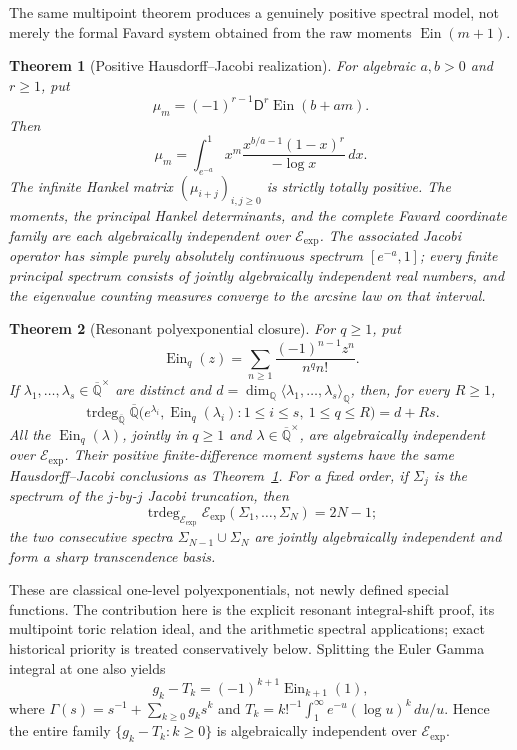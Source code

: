 \documentclass[11pt]{article}
\newtheorem{theorem}{Theorem}[section]
\theoremstyle{definition}
\theoremstyle{remark}
\newcommand{\Q}{\mathbb Q}
\newcommand{\Qbar}{\overline{\mathbb Q}}
\newcommand{\trdeg}{\operatorname{trdeg}}
\newcommand{\Ein}{\operatorname{Ein}}
\newcommand{\EinDepth}[1]{\operatorname{Ein}_{#1}}
\newcommand{\Eexp}{\mathcal E_{\mathrm{exp}}}
\begin{document}
The same multipoint theorem produces a genuinely positive spectral model,
not merely the formal Favard system obtained from the raw moments
\(\Ein(m+1)\).

\begin{theorem}[Positive Hausdorff--Jacobi realization]
\label{thm:positive-jacobi-intro}
For algebraic \(a,b>0\) and \(r\geq1\), put
\[
 \mu_m=(-1)^{r-1}\mathsf D^r\Ein(b+am).
\]
Then
\[
 \mu_m=\int_{e^{-a}}^1x^m
 \frac{x^{b/a-1}(1-x)^r}{-\log x}\,dx.
\]
The infinite Hankel matrix \((\mu_{i+j})_{i,j\geq0}\) is strictly totally
positive.  The moments, the principal Hankel determinants, and the complete
Favard coordinate family are each algebraically independent over
\(\Eexp\).  The associated Jacobi operator has simple purely absolutely
continuous spectrum \([e^{-a},1]\); every finite principal spectrum consists
of jointly algebraically independent real numbers, and the eigenvalue
counting measures converge to the arcsine law on that interval.
\end{theorem}

\begin{theorem}[Resonant polyexponential closure]
\label{thm:polyexponential-intro}
For \(q\geq1\), put
\[
 \EinDepth{q}(z)=
 \sum_{n\geq1}\frac{(-1)^{n-1}z^n}{n^q n!}.
\]
If \(\lambda_1,\ldots,\lambda_s\in\Qbar^\times\) are distinct and
\(d=\dim_\Q\langle\lambda_1,\ldots,\lambda_s\rangle_\Q\), then, for every
\(R\geq1\),
\[
 \trdeg_{\Qbar}\Qbar\bigl(
 e^{\lambda_i},\EinDepth{q}(\lambda_i):
 1\leq i\leq s,\ 1\leq q\leq R\bigr)=d+Rs.
\]
All the \(\EinDepth{q}(\lambda)\), jointly in \(q\geq1\) and
\(\lambda\in\Qbar^\times\), are algebraically independent over \(\Eexp\).
Their positive finite-difference moment systems have the same
Hausdorff--Jacobi conclusions as Theorem~\ref{thm:positive-jacobi-intro}.
For a fixed order, if \(\Sigma_j\) is the spectrum of the \(j\)-by-\(j\)
Jacobi truncation, then
\[
 \trdeg_{\Eexp}\Eexp(\Sigma_1,\ldots,\Sigma_N)=2N-1;
\]
the two consecutive spectra \(\Sigma_{N-1}\cup\Sigma_N\) are jointly
algebraically independent and form a sharp transcendence basis.
\end{theorem}

These are classical one-level polyexponentials, not newly defined special
functions.  The contribution here is the explicit resonant integral-shift
proof, its multipoint toric relation ideal, and the arithmetic spectral
applications; exact historical priority is treated conservatively below.
Splitting the Euler Gamma integral at one also yields
\[
 g_k-T_k=(-1)^{k+1}\EinDepth{k+1}(1),
\]
where \(\Gamma(s)=s^{-1}+\sum_{k\geq0}g_ks^k\) and
\(T_k=k!^{-1}\int_1^\infty e^{-u}(\log u)^k\,du/u\).  Hence the entire
family \(\{g_k-T_k:k\geq0\}\) is algebraically independent over
\(\Eexp\).
\end{document}
